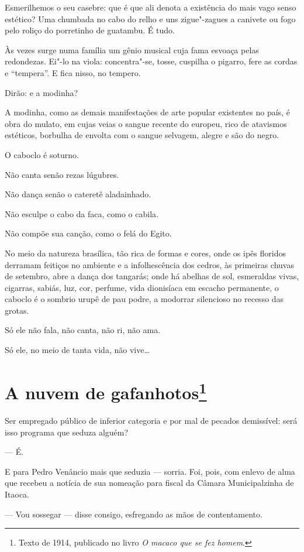 Esmerilhemos o seu casebre: que é que ali denota a existência do mais
vago senso estético? Uma chumbada no cabo do relho e uns zigue"-zagues a
canivete ou fogo pelo roliço do porretinho de guatambu. É tudo.

Às vezes surge numa família um gênio musical cuja fama esvoaça pelas
redondezas. Ei"-lo na viola: concentra"-se, tosse, cuspilha o pigarro,
fere as cordas e ``tempera''. E fica nisso, no tempero.

Dirão: e a modinha?

A modinha, como as demais manifestações de arte popular existentes no
país, é obra do mulato, em cujas veias o sangue recente do europeu, rico
de atavismos estéticos, borbulha de envolta com o sangue selvagem,
alegre e são do negro.

O caboclo é soturno.

Não canta senão rezas lúgubres.

Não dança senão o cateretê aladainhado.

Não esculpe o cabo da faca, como o cabila.

Não compõe sua canção, como o felá do Egito.

No meio da natureza brasílica, tão rica de formas e cores, onde os ipês
floridos derramam feitiços no ambiente e a infolhescência dos cedros, às
primeiras chuvas de setembro, abre a dança dos tangarás; onde há abelhas
de sol, esmeraldas vivas, cigarras, sabiás, luz, cor, perfume, vida
dionisíaca em escacho permanente, o caboclo é o sombrio urupê de pau
podre, a modorrar silencioso no recesso das grotas.

Só ele não fala, não canta, não ri, não ama.

Só ele, no meio de tanta vida, não vive\ldots{}

\chapter{A nuvem de gafanhotos\footnote[*]{Texto de 1914, publicado no livro \emph{O macaco que se fez homem}.}}

Ser empregado público de inferior categoria e por mal de pecados
demissível: será isso programa que seduza alguém?

--- É.

E para Pedro Venâncio mais que seduzia --- sorria. Foi, pois, com enlevo
de alma que recebeu a notícia de sua nomeação para fiscal da Câmara
Municipalzinha de Itaoca.

--- Vou sossegar --- disse consigo, esfregando as mãos de contentamento.

